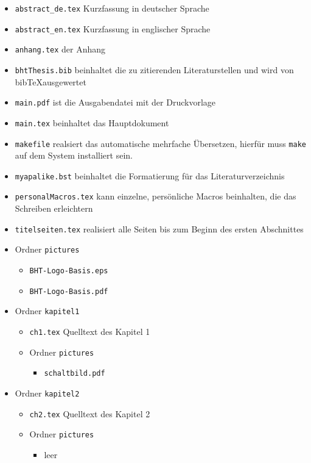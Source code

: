 \begin{itemize}
\item \texttt{abstract\_de.tex} Kurzfassung in deutscher Sprache
\item \texttt{abstract\_en.tex} Kurzfassung in englischer Sprache
\item \texttt{anhang.tex} der Anhang
\item \texttt{bhtThesis.bib} beinhaltet die zu zitierenden Literaturstellen und
  wird von bib\TeX ausgewertet 
\item \texttt{main.pdf} ist die Ausgabendatei mit der Druckvorlage
\item \texttt{main.tex} beinhaltet das Hauptdokument
\item \texttt{makefile} realsiert das automatische mehrfache Übersetzen, hierfür
  muss \texttt{make} auf dem System installiert sein.
\item \texttt{myapalike.bst} beinhaltet die Formatierung für das
  Literaturverzeichnis 
\item \texttt{personalMacros.tex} kann einzelne, persönliche Macros beinhalten, die
  das Schreiben erleichtern
\item \texttt{titelseiten.tex} realisiert alle Seiten bis zum Beginn des ersten
  Abschnittes  

\item Ordner \texttt{pictures}
  \begin{itemize}
  \item \texttt{BHT-Logo-Basis.eps}
  \item \texttt{BHT-Logo-Basis.pdf}
  \end{itemize}

\item Ordner \texttt{kapitel1}
  \begin{itemize}
  \item \texttt{ch1.tex} Quelltext des Kapitel 1
  \item Ordner \texttt{pictures}
    \begin{itemize}
    \item \texttt{schaltbild.pdf}
    \end{itemize}
  \end{itemize}
  
\item Ordner \texttt{kapitel2}
  \begin{itemize}
  \item \texttt{ch2.tex} Quelltext des Kapitel 2
  \item Ordner \texttt{pictures}
    \begin{itemize}
    \item leer
    \end{itemize}
  \end{itemize}  
\end{itemize}

